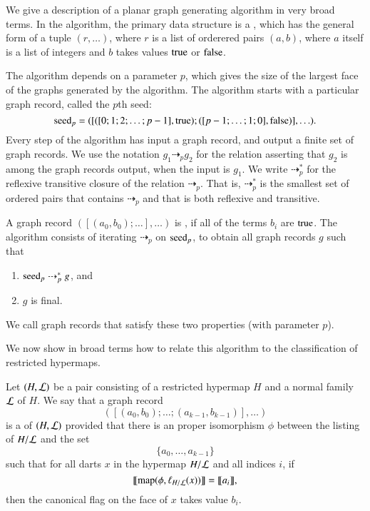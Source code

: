 \bigskip

We give a description of a planar graph generating algorithm in very
broad terms.  In the algorithm, the primary data structure is a
, which has the general form of a tuple
$(r,\ldots)$, where $r$ is a list of orderered pairs $(a,b)$, where
$a$ itself is a list of integers and $b$ takes values ${\operatorname{true}}$ or
${\operatorname{false}}$.

The algorithm depends on a parameter $p$, which gives the size of the
largest face of the graphs generated by the algorithm.  The algorithm
starts with a particular graph record, called the $p$th seed:
\[
{\operatorname{seed}}_p =
([   
 ([0;1;2;\ldots;p-1],{\operatorname{true}}); ([p-1;\ldots;1;0],{\operatorname{false}}) ],\ldots).
\]
Every step of the algorithm has input a graph record, and output a
finite set of graph records.  We use the notation $g_1
\dashrightarrow_p g_2$ for the relation asserting that $g_2$ is among
the graph records output, when the input is $g_1$.  We write
$\dashrightarrow_p^*$ for the reflexive transitive closure of the
relation $\dashrightarrow_p$.  That is, $\dashrightarrow_p^*$ is the
smallest set of ordered pairs that contains $\dashrightarrow_p$ and
that is both reflexive and transitive.

A graph record $([(a_0,b_0);\ldots],\ldots)$ is , if all of
the terms $b_i$ are ${\operatorname{true}}$.  
The algorithm consists of iterating $\dashrightarrow_p$ on  ${\operatorname{seed}}_p$,
to obtain all graph records $g$ such that
\begin{enumerate}
\item ${\operatorname{seed}}_p \dashrightarrow_p^* g$, and
\item $g$ is final.
\end{enumerate}
We call  graph records that satisfy these two properties
 (with parameter $p$).

We now show in broad terms how to relate this algorithm to the
classification of restricted hypermaps.

\begin{definition}[record]
  Let $(H,{\cal L})$ be a pair consisting of a restricted hypermap $H$
  and a normal family ${\cal L}$ of $H$.  We say that a graph record
\[
([(a_0,b_0);\ldots;(a_{k-1},b_{k-1})],\ldots)
\]
is a  of $(H,{\cal L})$ provided that there is an
proper isomorphism $\phi$ between the listing of $H/{\cal L}$ and the
set
\[
\{a_0,\ldots,a_{k-1}\}
\]
such that for all darts $x$ in the hypermap $H/{\cal L}$ and all
indices $i$, if
\[
{\llbracket{{\operatorname{map}}(\phi,\ell_{H/{\cal L}}(x))}\rrbracket} = {\llbracket{a_i}\rrbracket},
\]
then the canonical flag on the face of $x$ takes value $b_i$.
\end{definition}


